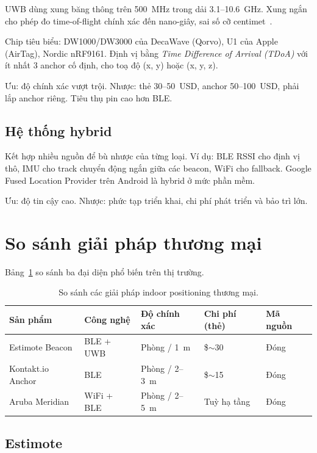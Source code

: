UWB dùng xung băng thông trên 500~MHz trong dải 3.1--10.6~GHz. Xung ngắn cho phép đo time-of-flight chính xác đến nano-giây, sai số cỡ centimet~\cite{decawave-app-note}.

Chip tiêu biểu: DW1000/DW3000 của DecaWave (Qorvo), U1 của Apple (AirTag), Nordic nRF9161. Định vị bằng \textit{Time Difference of Arrival (TDoA)} với ít nhất 3 anchor cố định, cho toạ độ (x, y) hoặc (x, y, z).

Ưu: độ chính xác vượt trội. Nhược: thẻ 30--50~USD, anchor 50--100~USD, phải lắp anchor riêng. Tiêu thụ pin cao hơn BLE.

\subsection{Hệ thống hybrid}

Kết hợp nhiều nguồn để bù nhược của từng loại. Ví dụ: BLE RSSI cho định vị thô, IMU cho track chuyển động ngắn giữa các beacon, WiFi cho fallback. Google Fused Location Provider trên Android là hybrid ở mức phần mềm.

Ưu: độ tin cậy cao. Nhược: phức tạp triển khai, chi phí phát triển và bảo trì lớn.

\section{So sánh giải pháp thương mại}

Bảng~\ref{tab:commercial} so sánh ba đại diện phổ biến trên thị trường.

\begin{table}[htp]
    \centering
    \caption{So sánh các giải pháp indoor positioning thương mại.}
    \label{tab:commercial}
    \begin{tabular}{lllll}
        \hline
        \textbf{Sản phẩm} & \textbf{Công nghệ} & \textbf{Độ chính xác} & \textbf{Chi phí (thẻ)} & \textbf{Mã nguồn} \\
        \hline
        Estimote Beacon & BLE + UWB & Phòng / 1~m & \$$\sim$30 & Đóng \\
        Kontakt.io Anchor & BLE & Phòng / 2--3~m & \$$\sim$15 & Đóng \\
        Aruba Meridian & WiFi + BLE & Phòng / 2--5~m & Tuỳ hạ tầng & Đóng \\
        \hline
    \end{tabular}
\end{table}

\subsection{Estimote}

